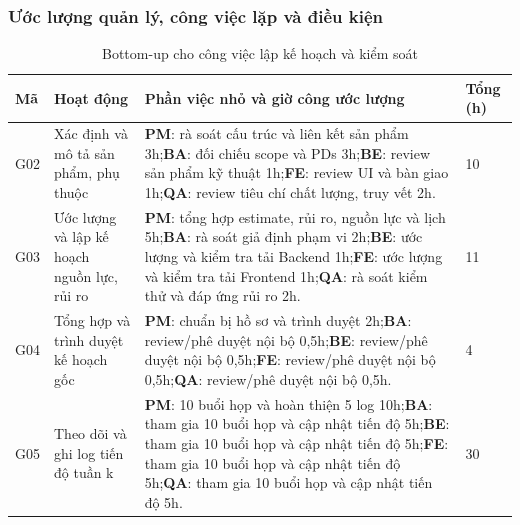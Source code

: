 \subsubsection{Ước lượng quản lý, công việc lặp và điều kiện}
\begin{table}[H]
\centering
\caption{Bottom-up cho công việc lập kế hoạch và kiểm soát}
\footnotesize
\renewcommand{\arraystretch}{1.2}
\begin{tabularx}{\linewidth}{|p{0.8cm}|p{2.8cm}|>{\raggedright\arraybackslash}X|p{0.9cm}|}
\hline
\textbf{Mã} & \textbf{Hoạt động} & \textbf{Phần việc nhỏ và giờ công ước lượng} & \textbf{Tổng (h)} \\ \hline
G02 & Xác định và mô tả sản phẩm, phụ thuộc & \textbf{PM}: rà soát cấu trúc và liên kết sản phẩm 3h;\newline \textbf{BA}: đối chiếu scope và PDs 3h;\newline \textbf{BE}: review sản phẩm kỹ thuật 1h;\newline \textbf{FE}: review UI và bàn giao 1h;\newline \textbf{QA}: review tiêu chí chất lượng, truy vết 2h. & 10 \\ \hline
G03 & Ước lượng và lập kế hoạch nguồn lực, rủi ro & \textbf{PM}: tổng hợp estimate, rủi ro, nguồn lực và lịch 5h;\newline \textbf{BA}: rà soát giả định phạm vi 2h;\newline \textbf{BE}: ước lượng và kiểm tra tải Backend 1h;\newline \textbf{FE}: ước lượng và kiểm tra tải Frontend 1h;\newline \textbf{QA}: rà soát kiểm thử và đáp ứng rủi ro 2h. & 11 \\ \hline
G04 & Tổng hợp và trình duyệt kế hoạch gốc & \textbf{PM}: chuẩn bị hồ sơ và trình duyệt 2h;\newline \textbf{BA}: review/phê duyệt nội bộ 0,5h;\newline \textbf{BE}: review/phê duyệt nội bộ 0,5h;\newline \textbf{FE}: review/phê duyệt nội bộ 0,5h;\newline \textbf{QA}: review/phê duyệt nội bộ 0,5h. & 4 \\ \hline
G05 & Theo dõi và ghi log tiến độ tuần k & \textbf{PM}: 10 buổi họp và hoàn thiện 5 log 10h;\newline \textbf{BA}: tham gia 10 buổi họp và cập nhật tiến độ 5h;\newline \textbf{BE}: tham gia 10 buổi họp và cập nhật tiến độ 5h;\newline \textbf{FE}: tham gia 10 buổi họp và cập nhật tiến độ 5h;\newline \textbf{QA}: tham gia 10 buổi họp và cập nhật tiến độ 5h. & 30 \\ \hline

\end{tabularx}
\end{table}
